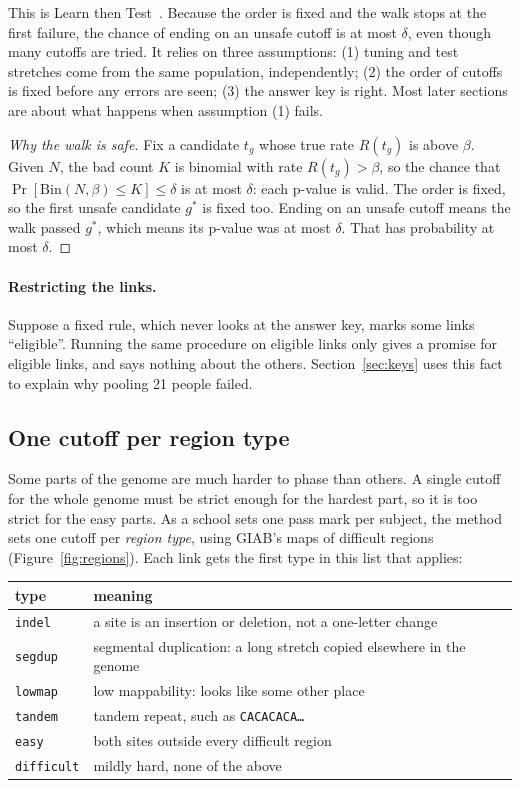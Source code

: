 \documentclass[11pt]{article}
\newcommand{\dna}[1]{\texttt{#1}}
\newcommand{\grp}[1]{\texttt{#1}}
\newcommand{\Bin}{\mathrm{Bin}}
\begin{document}
This is Learn then Test~\cite{ltt2025}. Because the order is fixed and the
walk stops at the first failure, the chance of ending on an unsafe cutoff is
at most $\delta$, even though many cutoffs are tried. It relies on three
assumptions: (1) tuning and test stretches come from the same population,
independently; (2) the order of cutoffs is fixed before any errors are seen;
(3) the answer key is right. Most later sections are about what happens
when assumption (1) fails.

\begin{proof}[Why the walk is safe]
Fix a candidate $t_g$ whose true rate $R(t_g)$ is above $\beta$. Given $N$,
the bad count $K$ is binomial with rate $R(t_g)>\beta$, so the chance that
$\Pr[\Bin(N,\beta)\le K]\le\delta$ is at most $\delta$: each p-value is
valid. The order is fixed, so the first unsafe candidate $g^*$ is fixed
too. Ending on an unsafe cutoff means the walk passed $g^*$, which means its
p-value was at most $\delta$. That has probability at most $\delta$.
\end{proof}

\paragraph{Restricting the links.} Suppose a fixed rule, which never looks
at the answer key, marks some links \enquote{eligible}. Running the same procedure
on eligible links only gives a promise for eligible links, and says nothing
about the others. Section~\ref{sec:keys} uses this fact to explain why
pooling 21 people failed.

\subsection{One cutoff per region type}\label{sec:regions}

Some parts of the genome are much harder to phase than others. A single
cutoff for the whole genome must be strict enough for the hardest part, so
it is too strict for the easy parts. As a school sets one pass
mark per subject, the method sets one cutoff per \emph{region type}, using
GIAB's maps of difficult regions~\cite{dwarshuis2024}
(Figure~\ref{fig:regions}). Each link gets the first type in this list that
applies:

\begin{center}
\small
\begin{tabular}{@{}lp{11.5cm}@{}}
\toprule
type & meaning\\
\midrule
\grp{indel} & a site is an insertion or deletion, not a one-letter change\\
\grp{segdup} & segmental duplication: a long stretch copied elsewhere in the genome\\
\grp{lowmap} & low mappability: looks like some other place\\
\grp{tandem} & tandem repeat, such as \dna{CACACACA\dots}\\
\grp{easy} & both sites outside every difficult region\\
\grp{difficult} & mildly hard, none of the above\\
\bottomrule
\end{tabular}
\end{center}
\end{document}
